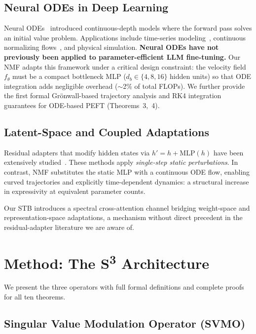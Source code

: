 \documentclass{scpe}
\newcommand{\svmo}{\textsc{SVMO}}
\newcommand{\nmf}{\textsc{NMF}}
\newcommand{\stb}{\textsc{STB}}
\newcommand{\sthree}{S\textsuperscript{3}}
\begin{document}
\subsection{Neural ODEs in Deep Learning}

Neural ODEs~\cite{chen2018neuralode} introduced continuous-depth models where the forward pass solves an initial value problem. Applications include time-series modeling~\cite{rubanova2019latentode}, continuous normalizing flows~\cite{grathwohl2018ffjord}, and physical simulation. \textbf{Neural ODEs have not previously been applied to parameter-efficient LLM fine-tuning.} Our \nmf{} adapts this framework under a critical design constraint: the velocity field $f_\theta$ must be a compact bottleneck MLP ($d_b \in \{4,8,16\}$ hidden units) so that ODE integration adds negligible overhead ($\sim$2\% of total FLOPs). We further provide the first formal Gr\"onwall-based trajectory analysis and RK4 integration guarantees for ODE-based PEFT (Theorems~3,~4).

\subsection{Latent-Space and Coupled Adaptations}

Residual adapters that modify hidden states via $h' = h + \text{MLP}(h)$ have been extensively studied~\cite{houlsby2019adapters,pfeiffer2020adapterfusion}. These methods apply \textit{single-step static perturbations}. In contrast, \nmf{} substitutes the static MLP with a continuous ODE flow, enabling curved trajectories and explicitly time-dependent dynamics: a structural increase in expressivity at equivalent parameter counts.

Our \stb{} introduces a spectral cross-attention channel bridging weight-space and representation-space adaptations, a mechanism without direct precedent in the residual-adapter literature we are aware of.

\section{Method: The \sthree{} Architecture}

We present the three operators with full formal definitions and complete proofs for all ten theorems.

\subsection{Singular Value Modulation Operator (\svmo)}
\label{sec:svmo}
\end{document}
